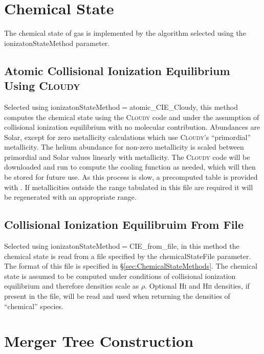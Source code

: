\section{Chemical State}\label{sec:ChemicalStateMethod}

The chemical state of gas is implemented by the algorithm selected using the {\normalfont \ttfamily ionizatonStateMethod} parameter.

\subsection{Atomic Collisional Ionization Equilibrium Using {\normalfont \scshape Cloudy}}

Selected using {\normalfont \ttfamily ionizatonStateMethod}$=${\normalfont \ttfamily atomic\_CIE\_Cloudy}, this method computes the chemical state using the {\normalfont \scshape Cloudy} code and under the assumption of collisional ionization equilibrium with no molecular contribution. Abundances are Solar, except for zero metallicity calculations which use {\normalfont \scshape Cloudy}'s ``primordial'' metallicity. The helium abundance for non-zero metallicity is scaled between primordial and Solar values linearly with metallicity. The {\normalfont \scshape Cloudy} code will be downloaded and run to compute the cooling function as needed, which will then be stored for future use. As this process is slow, a precomputed table is provided with \glc. If metallicities outside the range tabulated in this file are required it will be regenerated with an appropriate range.

\subsection{Collisional Ionization Equilibruim From File}

Selected using {\normalfont \ttfamily ionizatonStateMethod}$=${\normalfont \ttfamily CIE\_from\_file}, in this method the chemical state is read from a file specified by the {\normalfont \ttfamily chemicalStateFile} parameter. The format of this file is specified in \S\ref{sec:ChemicalStateMethods}. The chemical state is assumed to be computed under conditions of collisional ionization equilibrium and therefore densities scale as $\rho$. Optional H{\normalfont \scshape i} and H{\normalfont \scshape ii} densities, if present in the file, will be read and used when returning the densities of ``chemical'' species.

\section{Merger Tree Construction}

